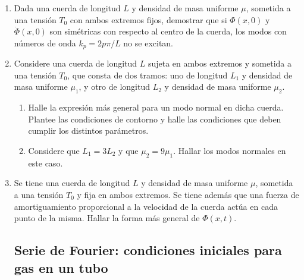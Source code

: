\documentclass[11pt,spanish,a4paper]{article}
\begin{document}
\begin{enumerate}
\item Dada una cuerda de longitud $L$ y densidad de masa uniforme $\mu$,
sometida a una tensión $T_{0}$ con ambos extremos fijos, demostrar
que si $\Phi(x,0)$ y $\dot{\Phi}(x,0)$ son simétricas con respecto
al centro de la cuerda, los modos con números de onda $k_{p}=2p\pi/L$
no se excitan.
\item Considere una cuerda de longitud $L$ sujeta en ambos extremos y sometida
a una tensión $T_{0}$, que consta de dos tramos: uno de longitud
$L_{1}$ y densidad de masa uniforme $\mu_{1}$, y otro de longitud
$L_{2}$ y densidad de masa uniforme $\mu_{2}$.
\begin{enumerate}
	\item Halle la expresión más general para un modo normal en dicha cuerda.
Plantee las condiciones de contorno y halle las condiciones que deben
cumplir los distintos parámetros.
	\item Considere que $L_{1}=3L_{2}$ y que $\mu_{2}=9\mu_{1}$. Hallar los
modos normales en este caso.
\end{enumerate}


\item Se tiene una cuerda de longitud $L$ y densidad de masa uniforme $\mu$,
sometida a una tensión $T_{0}$ y fija en ambos extremos. Se tiene
además que una fuerza de amortiguamiento proporcional a la velocidad
de la cuerda actúa en cada punto de la misma. Hallar la forma más
general de $\Phi(x,t)$.


\subsection*{Serie de Fourier: condiciones iniciales para gas en un tubo}



\end{enumerate}
\end{document}
